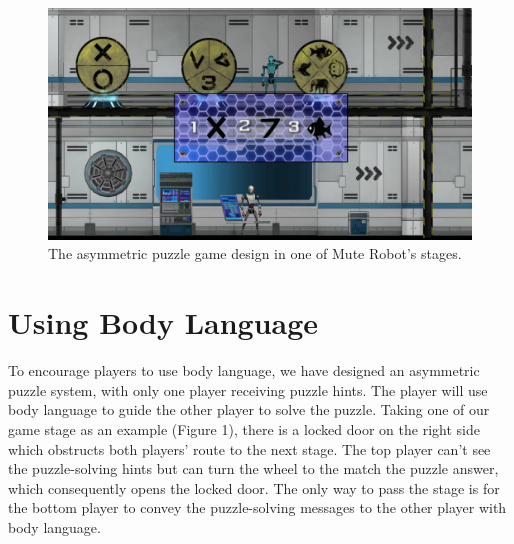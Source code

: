 \documentclass{chi-ext}
\begin{document}

\begin{figure}
  \centering
  \includegraphics[width=\linewidth]{figures/Figure1.jpg}
  \caption{The asymmetric puzzle game design in one of Mute Robot's stages.}
  \label{fig:Figure1}
\end{figure}


\section{Using Body Language}

To encourage players to use body language, we have designed an asymmetric puzzle system, with only one player receiving puzzle hints. The player will use body language to guide the other player to solve the puzzle.
Taking one of our game stage as an example (Figure 1), there is a locked door on the right side which obstructs both players' route to the next stage. 
The top player can't see the puzzle-solving hints but can turn the wheel to the match the puzzle answer, which consequently opens the locked door.
The only way to pass the stage is for the bottom player to convey the puzzle-solving messages to the other player with body language. 

\end{document}
